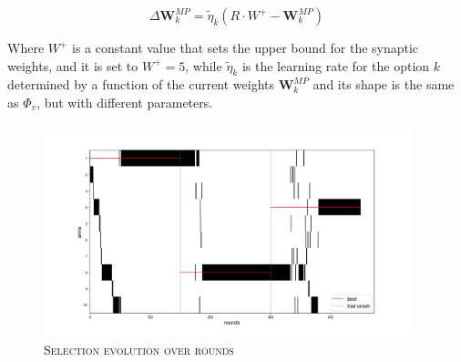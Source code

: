 \begin{equation}
    \Delta \textbf{W}^{MP}_{k} = \tilde{\eta}_{k} \left(R\cdot W^{+}- \textbf{W}^{MP}_{k}\right)
\end{equation}

\noindent
Where $W^{+}$ is a constant value that sets the upper bound for the synaptic weights, and it is set to $W^{+} = 5$, while $\tilde{\eta}_{k}$ is the learning rate for the option $k$ determined by a function of the current weights $\textbf{W}^{MP}_{k}$ and its shape is the same as $\Phi_{v}$, but with
different parameters.


\begin{figure}[h]
    \centering
    \includegraphics[width=0.95\textwidth]{figures/selections_1.png}
    \caption{\textsc{Selection evolution over rounds}}
    \label{fig:sel1}
\end{figure}
